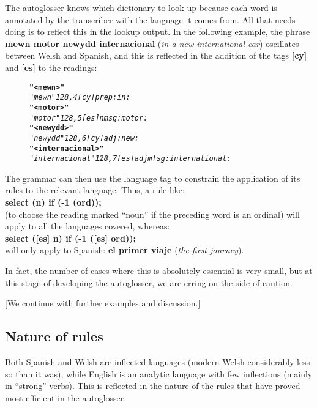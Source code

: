 \documentclass[11pt]{article}
\begin{document}
The autoglosser knows which dictionary to look up because each word is annotated by the transcriber with the language it comes from.  All that needs doing is to reflect this in the lookup output.  In the following example, the phrase \textbf{mewn motor newydd internacional} (\textit{in a new international car}) oscillates between Welsh and Spanish, and this is reflected in the addition of the tags \textbf{[cy]} and \textbf{[es]} to the readings:

\begin{figure}[h]
\vspace{-10pt}
\begin{alltt}
\normalfont
\textbf{"<mewn>"}
    \textit{"mewn" {128,4} [cy] prep :in:}
\textbf{"<motor>"}
    \textit{"motor" {128,5} [es] n m sg :motor:}
\textbf{"<newydd>"}
    \textit{"newydd" {128,6} [cy] adj :new:}
\textbf{"<internacional>"}
    \textit{"internacional" {128,7} [es] adj mf sg :internat\-ional:}
\end{alltt}
\vspace{-10pt}
\end{figure}

The grammar can then use the language tag to constrain the application of its rules to the relevant language.  Thus, a rule like:\\
\indent\textbf{select (n) if (-1 (ord));}\\
(to choose the reading marked ``noun'' if the preceding word is an ordinal) will apply to all the languages covered, whereas:\\
\indent\textbf{select ([es] n) if (-1 ([es] ord));}\\
will only apply to Spanish: \textbf{el primer viaje} (\textit{the first journey}).

In fact, the number of cases where this is absolutely essential is very small, but at this stage of developing the autoglosser, we are erring on the side of caution.

[We continue with further examples and discussion.]

\subsection{Nature of rules}
\label{sec:nature}

Both Spanish and Welsh are inflected languages (modern Welsh considerably less so than it was), while English is an analytic language with few inflections (mainly in ``strong'' verbs).  This is reflected in the nature of the rules that have proved most efficient in the autoglosser.  
\end{document}

